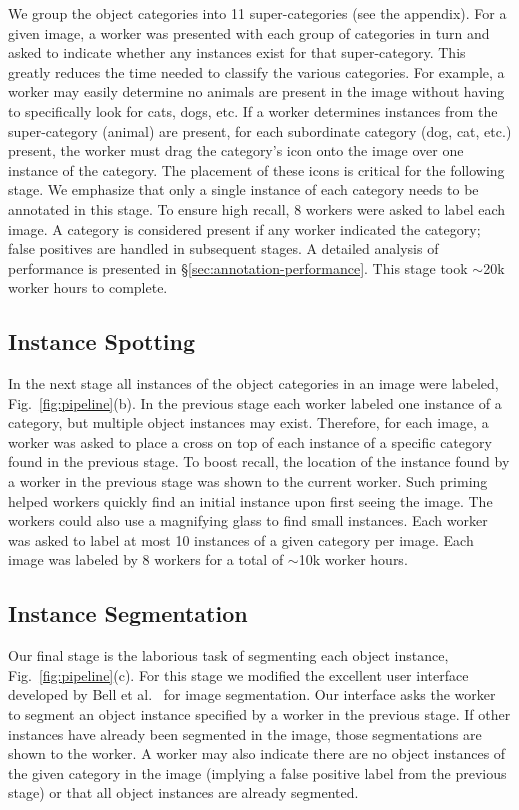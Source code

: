 We group the object categories into 11 super-categories (see the appendix). For a given image, a worker was presented with each group of categories in turn and asked to indicate whether any instances exist for that super-category. This greatly reduces the time needed to classify the various categories. For example, a worker may easily determine no animals are present in the image without having to specifically look for cats, dogs, etc. If a worker determines instances from the super-category (animal) are present, for each subordinate category (dog, cat, etc.) present, the worker must drag the category's icon onto the image over one instance of the category. The placement of these icons is critical for the following stage. We emphasize that only a single instance of each category needs to be annotated in this stage. To ensure high recall, 8 workers were asked to label each image. A category is considered present if any worker indicated the category; false positives are handled in subsequent stages. A detailed analysis of performance is presented in \S\ref{sec:annotation-performance}. This stage took $\sim$20k worker hours to complete.

\subsection{Instance Spotting}\label{sec:instance-spotting} In the next stage all instances of the object categories in an image were labeled, Fig.~\ref{fig:pipeline}(b). In the previous stage each worker labeled one instance of a category, but multiple object instances may exist. Therefore, for each image, a worker was asked to place a cross on top of each instance of a specific category found in the previous stage. To boost recall, the location of the instance found by a worker in the previous stage was shown to the current worker. Such priming helped workers quickly find an initial instance upon first seeing the image. The workers could also use a magnifying glass to find small instances. Each worker was asked to label at most 10 instances of a given category per image. Each image was labeled by 8 workers for a total of $\sim$10k worker hours.

\subsection{Instance Segmentation}\label{sec:instance-segmentation} Our final stage is the laborious task of segmenting each object instance, Fig.~\ref{fig:pipeline}(c). For this stage we modified the excellent user interface developed by Bell et al.~\cite{bell13opensurfaces} for image segmentation. Our interface asks the worker to segment an object instance specified by a worker in the previous stage. If other instances have already been segmented in the image, those segmentations are shown to the worker. A worker may also indicate there are no object instances of the given category in the image (implying a false positive label from the previous stage) or that all object instances are already segmented.

